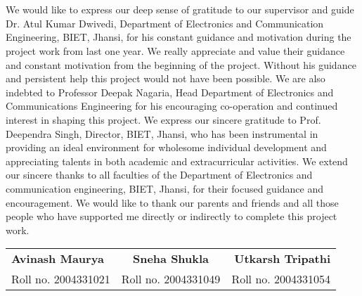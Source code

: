 \section*{}
\noindent We would like to express our deep sense of gratitude to our supervisor and guide Dr. Atul Kumar Dwivedi, Department of Electronics and Communication Engineering, BIET, Jhansi, for his constant guidance and motivation during the project work from last one year. We really appreciate and value their  guidance and constant motivation from the beginning of the project. Without his guidance and persistent help this project would not have been possible. 
We are also indebted to Professor Deepak Nagaria, Head Department of Electronics and Communications Engineering for his encouraging co-operation and continued interest in shaping this project.
We express our sincere gratitude to Prof. Deependra Singh, Director, BIET, Jhansi, who has been instrumental in providing an ideal environment for wholesome individual development and appreciating talents in both academic and extracurricular activities.
We extend our sincere thanks to all faculties of the Department of Electronics and communication engineering, BIET, Jhansi, for their focused guidance and encouragement.
We would like to thank our parents and friends and all those people who have supported me directly or indirectly to complete this project work. 

\par	
	\vspace{0.008cm}
	\noindent
		\begin{tabular}{lcr}
		\\
		\bfseries  Avinash Maurya & \hspace{1.5cm} \textbf{Sneha Shukla} & \bfseries \hspace{2.5cm}  Utkarsh Tripathi\\
			Roll no. 2004331021 & \hspace{1.5cm}Roll no. 2004331049  &
   Roll no. 2004331054
		\end{tabular}